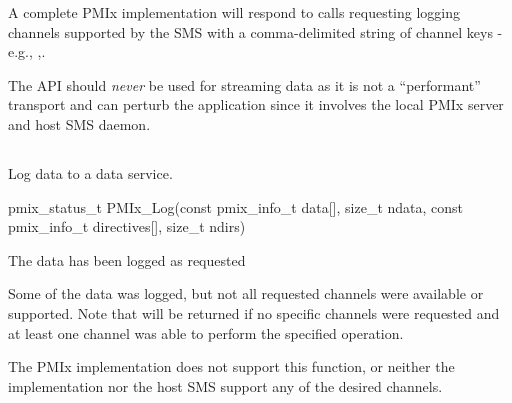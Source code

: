 \adviceimplstart
A complete \ac{PMIx} implementation will respond to  calls requesting logging channels supported by the \ac{SMS} with a comma-delimited string of channel keys - e.g., ,.
\adviceimplend

\adviceuserstart
The  API should \emph{never} be used for streaming data as it is not a ``performant'' transport and can perturb the application since it involves the local \ac{PMIx} server and host \ac{SMS} daemon.
\adviceuserend


\subsection{}

\summary

Log data to a data service.

\format

\cspecificstart
\begin{codepar}
pmix_status_t
PMIx_Log(const pmix_info_t data[], size_t ndata,
         const pmix_info_t directives[], size_t ndirs)
\end{codepar}
\cspecificend

\begin{arglist}
\end{arglist}

\begin{constantdesc}
\item {} The data has been logged as requested
\item {} Some of the data was logged, but not all requested channels were available or supported. Note that  will be returned if no specific channels were requested and at least one channel was able to perform the specified operation.
\item {} The \ac{PMIx} implementation does not support this function, or neither the implementation nor the host {SMS} support any of the desired channels.
\end{constantdesc}

